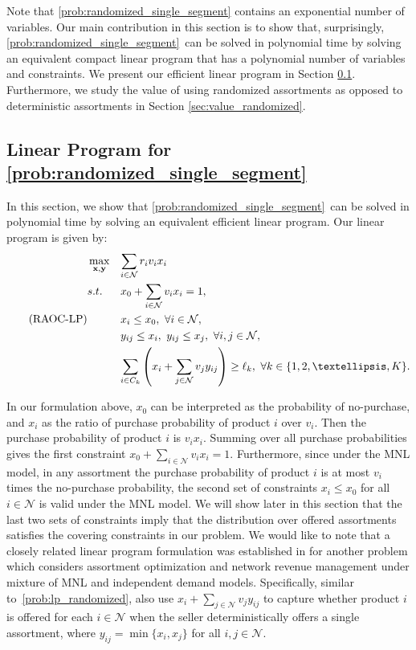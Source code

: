 \documentclass[msom,non-blindrev]{informs3} %
\theoremstyle{definition}
\begin{document}
Note that \eqref{prob:randomized_single_segment} contains an exponential number of variables. Our main contribution in this section is to show that, surprisingly, \eqref{prob:randomized_single_segment}~can be solved in polynomial time by solving an equivalent compact linear program that has a polynomial number of variables and constraints. We present our  efficient linear program in Section \ref{sec:LP-random}. Furthermore, we study the value of using randomized assortments as opposed to deterministic assortments in Section \ref{sec:value_randomized}.

\subsection{Linear Program for \ref{prob:randomized_single_segment}} \label{sec:LP-random}

In this section, we show that \eqref{prob:randomized_single_segment}~can be solved in polynomial time by solving an equivalent efficient linear program. Our linear program is given by:
\begin{equation}\label{prob:lp_randomized}\tag{RAOC-LP}
\begin{aligned}
&\max_{\mathbf{x},\mathbf{y}}&&{\sum_{i\in\mathcal{N}}r_iv_ix_i}\\
&\textup{s.t.}&&{x_0+\sum_{i\in\mathcal{N}}v_ix_i=1,}\\
&&&{x_i\leq x_0,\ \forall i\in\mathcal{N},}\\
&&&{y_{ij}\leq x_i,\ y_{ij}\leq x_j,\ \forall i,j\in\mathcal{N},}\\
&&&{\sum_{i\in C_k}\left(x_i+\sum_{j\in\mathcal{N}}v_jy_{ij}\right)\geq \ell_k,\ \forall k\in\{1,2,\dots,K\}.}
\end{aligned}
\end{equation}

In our formulation above, $x_0$ can be interpreted as the probability of no-purchase, and $x_i$ as the ratio of purchase probability of product $i$ over $v_i$. Then the purchase probability of product $i$ is $v_ix_i$. Summing over all purchase probabilities gives the first constraint $x_0+\sum_{i\in\mathcal{N}}v_ix_i=1$. Furthermore, since under the MNL model, in any assortment the purchase probability of product $i$ is at most $v_i$ times the no-purchase probability, the second set of constraints $x_i\leq x_0$ for all $i\in\mathcal{N}$ is valid under the MNL model. We will show later in this section
that the last two sets of constraints imply that the distribution over offered assortments satisfies the covering constraints in our problem. We would like to note that a closely related linear program formulation was established  in \cite{cao2023revenue} for another problem which considers assortment optimization and network revenue management under mixture of MNL and independent demand models. Specifically,  similar to~\eqref{prob:lp_randomized}, \cite{cao2023revenue}  also use $x_i+\sum_{j\in\mathcal{N}}v_jy_{ij}$  to capture {  whether} product $i$ {  is} offered for each $i\in\mathcal{N}$ {  when the seller deterministically offers a single assortment}, where $y_{ij}= \min\{x_i,x_j\}$ for all $i,j \in \mathcal{N}$.
\end{document}
